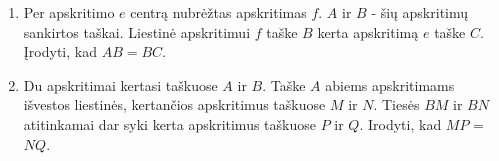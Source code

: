 \begin{enumerate}
\item Per apskritimo $e$ centrą nubrėžtas apskritimas $f$.
  $A$ ir $B$ - šių apskritimų sankirtos taškai. Liestinė
  apskritimui $f$ taške $B$  kerta apskritimą $e$ taške $C$.
  Įrodyti, kad $AB=BC$.   
\item Du apskritimai kertasi taškuose $A$ ir $B$. Taške $A$
  abiems apskritimams išvestos liestinės, kertančios
  apskritimus taškuose $M$ ir $N$. Tiesės $BM$ ir $BN$
  atitinkamai dar syki kerta apskritimus taškuose $P$ ir
  $Q$. Irodyti, kad $MP$ = $NQ$.  

\end{enumerate}
